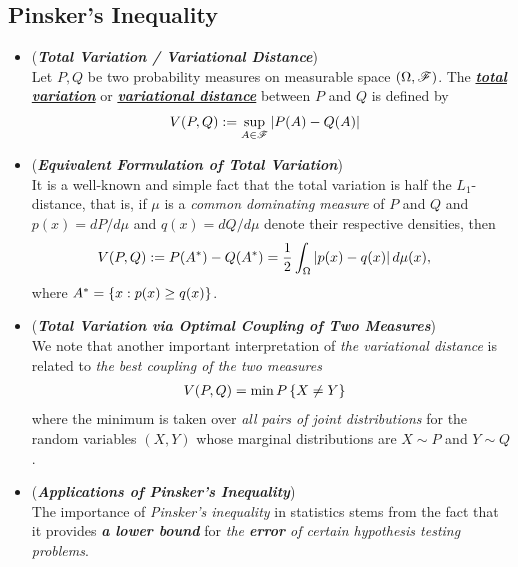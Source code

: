 \documentclass[11pt]{article}
\begin{document}
\subsection{Pinsker's Inequality}
\begin{itemize}
\item \begin{definition} (\emph{\textbf{Total Variation / Variational Distance}})\\
Let $P, Q$ be two probability measures on measurable space $(\Omega, {\mathscr F})$. The \underline{\emph{\textbf{total variation}}} or \underline{\emph{\textbf{variational distance}}} between $P$ and $Q$ is defined by
\begin{align}
V(P,Q) &:= \sup_{A \in {\mathscr F}}\left\lvert P(A) - Q(A) \right\rvert \label{def: total_variation_prob}
\end{align}
\end{definition}

\item \begin{remark} (\emph{\textbf{Equivalent Formulation of Total Variation}})\\
It is a well-known and simple fact that the total variation is half the $L_1$-distance, that is, if $\mu$ is a \emph{common dominating measure} of $P$ and $Q$ and $p(x) = dP/d\mu$ and $q(x) = dQ /d\mu$ denote their respective densities, then
\begin{align}
V(P,Q) &:= P(A^{*}) - Q(A^{*}) = \frac{1}{2}\int_{\Omega}\left\lvert p(x) - q(x) \right\rvert d\mu(x), \label{def: total_variation_l1}
\end{align} where $A^{*} = \left\{x: p(x) \ge q(x)\right\}$.
\end{remark}

\item \begin{remark} (\emph{\textbf{Total Variation via Optimal Coupling of Two Measures}})\\
We note that another important interpretation of \emph{the variational distance} is related to \emph{the best coupling of the two measures}
\begin{align}
V(P,Q) &= \min P\left\{X \neq Y\right\}
\end{align} where the minimum is taken over \emph{all pairs of joint distributions} for the random variables $(X, Y)$ whose marginal distributions are $X \sim P$ and $Y \sim Q$. 
\end{remark}

\item \begin{remark} (\emph{\textbf{Applications of Pinsker's Inequality}})\\
The importance of \emph{Pinsker's inequality} in statistics stems from the fact that it provides \emph{\textbf{a lower bound}} for \emph{the \textbf{error} of certain hypothesis testing problems}. 


\end{remark}
\end{itemize}
\end{document}
